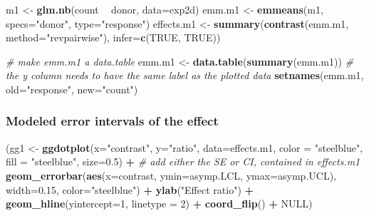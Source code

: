 \documentclass[]{book}
\newenvironment{Shaded}{\begin{snugshade}}{\end{snugshade}}
\newcommand{\KeywordTok}[1]{\textcolor[rgb]{0.13,0.29,0.53}{\textbf{#1}}}
\newcommand{\DataTypeTok}[1]{\textcolor[rgb]{0.13,0.29,0.53}{#1}}
\newcommand{\DecValTok}[1]{\textcolor[rgb]{0.00,0.00,0.81}{#1}}
\newcommand{\FloatTok}[1]{\textcolor[rgb]{0.00,0.00,0.81}{#1}}
\newcommand{\StringTok}[1]{\textcolor[rgb]{0.31,0.60,0.02}{#1}}
\newcommand{\CommentTok}[1]{\textcolor[rgb]{0.56,0.35,0.01}{\textit{#1}}}
\newcommand{\OtherTok}[1]{\textcolor[rgb]{0.56,0.35,0.01}{#1}}
\newcommand{\OperatorTok}[1]{\textcolor[rgb]{0.81,0.36,0.00}{\textbf{#1}}}
\newcommand{\NormalTok}[1]{#1}
\begin{document}
\begin{Shaded}
\begin{Highlighting}[]
\NormalTok{m1 <-}\StringTok{ }\KeywordTok{glm.nb}\NormalTok{(count }\OperatorTok{~}\StringTok{ }\NormalTok{donor, }\DataTypeTok{data=}\NormalTok{exp2d)}
\NormalTok{emm.m1 <-}\StringTok{ }\KeywordTok{emmeans}\NormalTok{(m1, }\DataTypeTok{specs=}\StringTok{"donor"}\NormalTok{, }\DataTypeTok{type=}\StringTok{"response"}\NormalTok{)}
\NormalTok{effects.m1 <-}\StringTok{ }\KeywordTok{summary}\NormalTok{(}\KeywordTok{contrast}\NormalTok{(emm.m1, }\DataTypeTok{method=}\StringTok{"revpairwise"}\NormalTok{), }\DataTypeTok{infer=}\KeywordTok{c}\NormalTok{(}\OtherTok{TRUE}\NormalTok{, }\OtherTok{TRUE}\NormalTok{))}

\CommentTok{# make emm.m1 a data.table}
\NormalTok{emm.m1 <-}\StringTok{ }\KeywordTok{data.table}\NormalTok{(}\KeywordTok{summary}\NormalTok{(emm.m1))}
\CommentTok{# the y column needs to have the same label as the plotted data}
\KeywordTok{setnames}\NormalTok{(emm.m1, }\DataTypeTok{old=}\StringTok{"response"}\NormalTok{, }\DataTypeTok{new=}\StringTok{"count"}\NormalTok{)}
\end{Highlighting}
\end{Shaded}

\subsubsection{Modeled error intervals of the
effect}\label{modeled-error-intervals-of-the-effect}

\begin{Shaded}
\begin{Highlighting}[]
\NormalTok{(gg1 <-}\StringTok{ }\KeywordTok{ggdotplot}\NormalTok{(}\DataTypeTok{x=}\StringTok{"contrast"}\NormalTok{, }
                 \DataTypeTok{y=}\StringTok{"ratio"}\NormalTok{, }
                 \DataTypeTok{data=}\NormalTok{effects.m1, }
                 \DataTypeTok{color =} \StringTok{"steelblue"}\NormalTok{,}
                 \DataTypeTok{fill =} \StringTok{"steelblue"}\NormalTok{,}
                 \DataTypeTok{size=}\FloatTok{0.5}\NormalTok{) }\OperatorTok{+}
\StringTok{   }
\StringTok{  }\CommentTok{# add either the SE or CI, contained in effects.m1}
\StringTok{  }\KeywordTok{geom_errorbar}\NormalTok{(}\KeywordTok{aes}\NormalTok{(}\DataTypeTok{x=}\NormalTok{contrast, }\DataTypeTok{ymin=}\NormalTok{asymp.LCL, }\DataTypeTok{ymax=}\NormalTok{asymp.UCL),}
                \DataTypeTok{width=}\FloatTok{0.15}\NormalTok{, }\DataTypeTok{color=}\StringTok{"steelblue"}\NormalTok{) }\OperatorTok{+}
\StringTok{  }\KeywordTok{ylab}\NormalTok{(}\StringTok{"Effect ratio"}\NormalTok{) }\OperatorTok{+}
\StringTok{  }\KeywordTok{geom_hline}\NormalTok{(}\DataTypeTok{yintercept=}\DecValTok{1}\NormalTok{, }\DataTypeTok{linetype =} \DecValTok{2}\NormalTok{) }\OperatorTok{+}
\StringTok{  }\KeywordTok{coord_flip}\NormalTok{() }\OperatorTok{+}\StringTok{ }
\StringTok{  }
\StringTok{  }\OtherTok{NULL}\NormalTok{)}
\end{Highlighting}
\end{Shaded}
\end{document}

